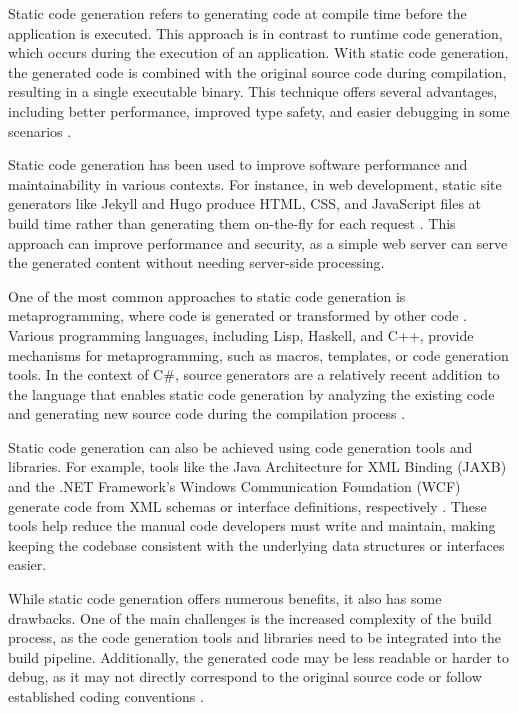 Static code generation refers to generating code at compile time before the application is executed. This approach is in contrast to runtime code generation, which occurs during the execution of an application. With static code generation, the generated code is combined with the original source code during compilation, resulting in a single executable binary. This technique offers several advantages, including better performance, improved type safety, and easier debugging in some scenarios \cite{Chiba2000}.

Static code generation has been used to improve software performance and maintainability in various contexts. For instance, in web development, static site generators like Jekyll and Hugo produce HTML, CSS, and JavaScript files at build time rather than generating them on-the-fly for each request \cite{Biilmann2015}. This approach can improve performance and security, as a simple web server can serve the generated content without needing server-side processing.

One of the most common approaches to static code generation is metaprogramming, where code is generated or transformed by other code \cite{Cordy1992}. Various programming languages, including Lisp, Haskell, and C++, provide mechanisms for metaprogramming, such as macros, templates, or code generation tools. In the context of C\#, source generators are a relatively recent addition to the language that enables static code generation by analyzing the existing code and generating new source code during the compilation process \cite{Microsoft2022SourceGenerators}.

Static code generation can also be achieved using code generation tools and libraries. For example, tools like the Java Architecture for XML Binding (JAXB) and the .NET Framework's Windows Communication Foundation (WCF) generate code from XML schemas or interface definitions, respectively \cite{Vogel2023, Microsoft2021WhatLearn}. These tools help reduce the manual code developers must write and maintain, making keeping the codebase consistent with the underlying data structures or interfaces easier.

While static code generation offers numerous benefits, it also has some drawbacks. One of the main challenges is the increased complexity of the build process, as the code generation tools and libraries need to be integrated into the build pipeline. Additionally, the generated code may be less readable or harder to debug, as it may not directly correspond to the original source code or follow established coding conventions \cite{Chiba2000}.


